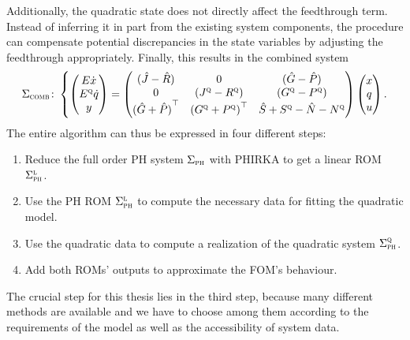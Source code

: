 
Additionally, the quadratic state does not directly affect the feedthrough term.
Instead of inferring it in part from the existing system components, the procedure can compensate potential discrepancies in the state variables by adjusting the feedthrough appropriately.
Finally, this results in the combined system
\begin{equation}\label{eq:combined-quadratic-system}
    \Sigma_{\textnormal{\scshape comb}} \colon \left\lbrace
    \begin{pmatrix}
        E \dot{x} \\
        E^{\textnormal{\scshape q}} \dot{q} \\
        y
    \end{pmatrix} = \begin{pmatrix}
        (\hat{J} - \hat{R}) & 0 & (\hat{G} - \hat{P}) \\
        0 & (J^{\textnormal{\scshape q}} - R^{\textnormal{\scshape q}}) & (G^{\textnormal{\scshape q}} - P^{\textnormal{\scshape q}}) \\
        {(\hat{G} + \hat{P})}^{\top} & {(G^{\textnormal{\scshape q}} + P^{\textnormal{\scshape q}})}^{\top} & \hat{S} + S^{\textnormal{\scshape q}} - \hat{N} - N^{\textnormal{\scshape q}}
    \end{pmatrix} \begin{pmatrix}
        x \\
        q \\
        u
    \end{pmatrix}.
    \right.
\end{equation}
The entire algorithm can thus be expressed in four different steps:
\begin{enumerate}
    \item Reduce the full order \ac{PH} system $\Sigma_{\textnormal{\scshape ph}}$ with \ac{PHIRKA} to get a linear \ac{ROM} $\Sigma_{\textnormal{\scshape ph}}^{\textnormal{\scshape l}}$.
    \item Use the \ac{PH} \ac{ROM} $\Sigma_{\textnormal{\scshape ph}}^{\textnormal{\scshape l}}$ to compute the necessary data for fitting the quadratic model.
    \item Use the quadratic data to compute a realization of the quadratic system $\Sigma_{\textnormal{\scshape ph}}^{\textnormal{\scshape q}}$.
    \item Add both \acp{ROM}' outputs to approximate the \ac{FOM}'s behaviour.
\end{enumerate}
The crucial step for this thesis lies in the third step, because many different methods are available and we have to choose among them according to the requirements of the model as well as the accessibility of system data.

